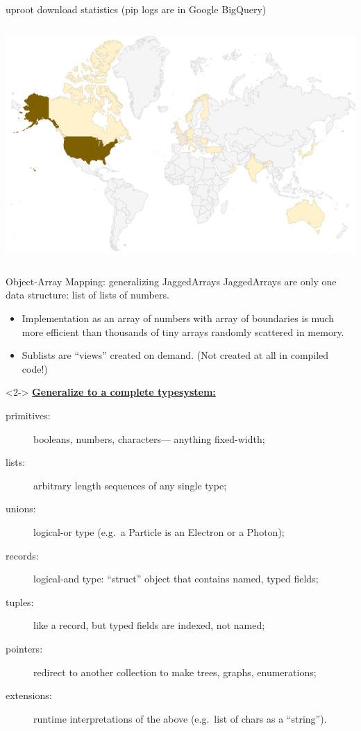 \documentclass[aspectratio=169]{beamer}
\begin{document}
\begin{frame}{uproot download statistics (pip logs are in Google BigQuery)}
\begin{columns}
\includegraphics[width=\linewidth]{downloads-by-country-2.png}

\end{columns}
\end{frame}

\begin{frame}{Object-Array Mapping: generalizing JaggedArrays}
\vspace{0.5 cm}
JaggedArrays are only one data structure: list of lists of numbers.
\begin{itemize}
\item Implementation as an array of numbers with array of boundaries is much more efficient than thousands of tiny arrays randomly scattered in memory.
\item Sublists are ``views'' created on demand. (Not created at all in compiled code!)
\end{itemize}

\begin{uncoverenv}<2->
\vspace{0.25 cm}
\underline{\bf Generalize to a complete typesystem:}
\begin{description}
\item[primitives:] booleans, numbers, characters--- anything fixed-width;
\item[lists:] arbitrary length sequences of any single type;
\item[unions:] logical-or type (e.g.\ a Particle is an Electron or a Photon);
\item[records:] logical-and type: ``struct'' object that contains named, typed fields;
\item[tuples:] like a record, but typed fields are indexed, not named;
\item[pointers:] redirect to another collection to make trees, graphs, enumerations;
\item[extensions:] runtime interpretations of the above (e.g.\ list of chars as a ``string'').
\end{description}
\end{uncoverenv}
\end{frame}
\end{document}
